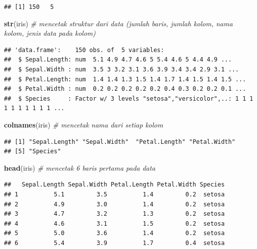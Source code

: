 \documentclass[]{article}
\newenvironment{Shaded}{\begin{snugshade}}{\end{snugshade}}
\newcommand{\KeywordTok}[1]{\textcolor[rgb]{0.13,0.29,0.53}{\textbf{#1}}}
\newcommand{\CommentTok}[1]{\textcolor[rgb]{0.56,0.35,0.01}{\textit{#1}}}
\newcommand{\NormalTok}[1]{#1}
\begin{document}
\begin{verbatim}
## [1] 150   5
\end{verbatim}

\begin{Shaded}
\begin{Highlighting}[]
\KeywordTok{str}\NormalTok{(iris) }\CommentTok{# mencetak struktur dari data (jumlah baris, jumlah kolom, nama kolom, jenis data pada kolom)}
\end{Highlighting}
\end{Shaded}

\begin{verbatim}
## 'data.frame':    150 obs. of  5 variables:
##  $ Sepal.Length: num  5.1 4.9 4.7 4.6 5 5.4 4.6 5 4.4 4.9 ...
##  $ Sepal.Width : num  3.5 3 3.2 3.1 3.6 3.9 3.4 3.4 2.9 3.1 ...
##  $ Petal.Length: num  1.4 1.4 1.3 1.5 1.4 1.7 1.4 1.5 1.4 1.5 ...
##  $ Petal.Width : num  0.2 0.2 0.2 0.2 0.2 0.4 0.3 0.2 0.2 0.1 ...
##  $ Species     : Factor w/ 3 levels "setosa","versicolor",..: 1 1 1 1 1 1 1 1 1 1 ...
\end{verbatim}

\begin{Shaded}
\begin{Highlighting}[]
\KeywordTok{colnames}\NormalTok{(iris) }\CommentTok{# mencetak nama dari setiap kolom}
\end{Highlighting}
\end{Shaded}

\begin{verbatim}
## [1] "Sepal.Length" "Sepal.Width"  "Petal.Length" "Petal.Width" 
## [5] "Species"
\end{verbatim}

\begin{Shaded}
\begin{Highlighting}[]
\KeywordTok{head}\NormalTok{(iris) }\CommentTok{# mencetak 6 baris pertama pada data}
\end{Highlighting}
\end{Shaded}

\begin{verbatim}
##   Sepal.Length Sepal.Width Petal.Length Petal.Width Species
## 1          5.1         3.5          1.4         0.2  setosa
## 2          4.9         3.0          1.4         0.2  setosa
## 3          4.7         3.2          1.3         0.2  setosa
## 4          4.6         3.1          1.5         0.2  setosa
## 5          5.0         3.6          1.4         0.2  setosa
## 6          5.4         3.9          1.7         0.4  setosa
\end{verbatim}
\end{document}
